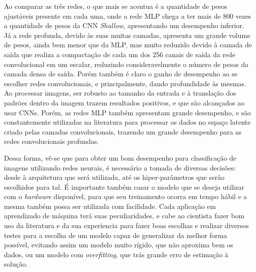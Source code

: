 Ao comparar as três redes, o que mais se acentua é a quantidade de pesos ajustáveis presente em cada uma, onde a rede MLP chega a ter mais de 800 vezes a quantidade de pesos da CNN \textit{Shallow}, apresentando um desempenho inferior. Já a rede profunda, devido às suas muitas camadas, apresenta um grande volume de pesos, ainda bem menor que da MLP, mas muito reduzido devido à camada de saída que realiza a compactação de cada um dos 256 canais de saída da rede convolucional em um escalar, reduzindo consideravelmente o número de pesos da camada densa de saída. Porém também é claro o ganho de desempenho ao se escolher redes convolucionais, e principalmente, dando profundidade às mesmas. Ao processar imagens, ser robusto ao tamanho da entrada e à translação dos padrões dentro da imagem trazem resultados positivos, e que são alcançados ao usar CNNs. Porém, as redes MLP também apresentam grande desempenho, e são constantemente utilizadas na literatura para processar os dados no espaço latente criado pelas camadas convolucionais, trazendo um grande desempenho para as redes convolucionais profundas.

Dessa forma, vê-se que para obter um bom desempenho para classificação de imagens utilizando redes neurais, é necessário a tomada de diversas decisões: desde à arquitetura que será utilizada, até os hiper-parâmetros que serão escolhidos para tal. É importante também casar o modelo que se deseja utilizar com o \textit{hardware} disponível, para que seu treinamento ocorra em tempo hábil e a mesma também possa ser utilizada com facilidade. Cada aplicação em aprendizado de máquina terá suas peculiaridades, e cabe ao cientista fazer bom uso da literatura e da sua experiencia para fazer boas escolhas e realizar diversos testes para a escolha de um modelo capaz de generalizar da melhor forma possível, evitando assim um modelo muito rígido, que não aproxima bem os dados, ou um modelo com \textit{overfitting}, que trás grande erro de estimação à solução.









